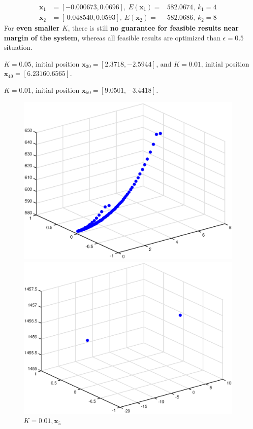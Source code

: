 \documentclass{article}
\begin{document}
\begin{eqnarray*}
\mathbf{x}_{1} &= [-0.000673,0.0696], ~E(\mathbf{x}_1) =& 582.0674, ~k_1 = 4\\
\mathbf{x}_{2} &= [~0.048540,0.0593], ~E(\mathbf{x}_2) =& 582.0686, ~k_2 = 8
\end{eqnarray*}
\noindent
For \textbf{even smaller $K$}, there is still \textbf{no guarantee for feasible results near margin of the system}, whereas all {feasible results are optimized} than $\epsilon = 0.5$ situation.

\newpage
$K=0.05$, initial position $\mathbf{x}_{30} = [2.3718,-2.5944]$, and $K=0.01$, initial position $\mathbf{x}_{40} = [6.2316 0.6565]$.

$K=0.01$, initial position $\mathbf{x}_{50} = [9.0501,-3.4418]$.

\begin{figure}[h]
\begin{minipage}[t]{0.5\linewidth}
\centering
\includegraphics[scale=0.4]{21.eps}
\caption{$K=0.05,0.01, \mathbf{x}_3, \mathbf{x}_4$}
\end{minipage}%
\begin{minipage}[t]{0.5\linewidth}
\centering
\includegraphics[scale=0.4]{22}
\caption{$K=0.01,\mathbf{x}_5$}
\end{minipage}
\end{figure}
\end{document}
